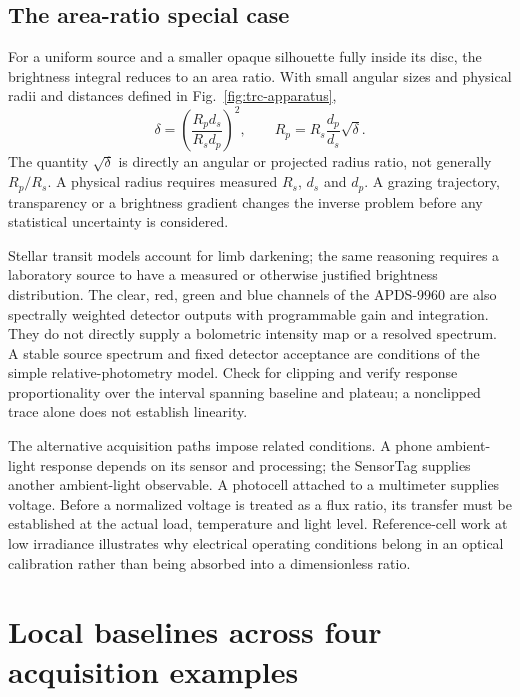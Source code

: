 \subsection{The area-ratio special case}
For a uniform source and a smaller opaque silhouette fully inside its disc, the brightness integral reduces to an area ratio. With small angular sizes and physical radii and distances defined in Fig.~\ref{fig:trc-apparatus},
\begin{equation}
\delta=\left(\frac{R_p d_s}{R_s d_p}\right)^2,
\qquad R_p=R_s\frac{d_p}{d_s}\sqrt{\delta}.
\label{eq:trc-radius}
\end{equation}
The quantity $\sqrt{\delta}$ is directly an angular or projected radius ratio, not generally $R_p/R_s$. A physical radius requires measured $R_s$, $d_s$ and $d_p$. A grazing trajectory, transparency or a brightness gradient changes the inverse problem before any statistical uncertainty is considered.

Stellar transit models account for limb darkening\cite{mandelagol}; the same reasoning requires a laboratory source to have a measured or otherwise justified brightness distribution. The clear, red, green and blue channels of the APDS-9960 are also spectrally weighted detector outputs with programmable gain and integration\cite{apds9960}. They do not directly supply a bolometric intensity map or a resolved spectrum. A stable source spectrum and fixed detector acceptance are conditions of the simple relative-photometry model. Check for clipping and verify response proportionality over the interval spanning baseline and plateau; a nonclipped trace alone does not establish linearity.

The alternative acquisition paths impose related conditions. A phone ambient-light response depends on its sensor and processing; the SensorTag supplies another ambient-light observable. A photocell attached to a multimeter supplies voltage. Before a normalized voltage is treated as a flux ratio, its transfer must be established at the actual load, temperature and light level. Reference-cell work at low irradiance\cite{hamadani2020} illustrates why electrical operating conditions belong in an optical calibration rather than being absorbed into a dimensionless ratio.

\section{Local baselines across four acquisition examples}
